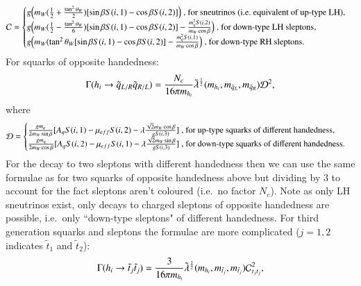 \documentclass[final,3p,times,pdflatex]{elsarticle}
\begin{document}
\begin{equation}
\mathcal{C} = \begin{cases} g\Big(m_{W}(\frac{1}{2}+{\tan^2 \theta_W \over 2})[\sin\beta S(i,1) - \cos\beta S(i,2)]\Big) $ , for sneutrinos (i.e.\ equivalent of up-type LH),$ \\
							g\Big(m_{W}(\frac{1}{2}-{\tan^2 \theta_W \over 6})[\sin\beta S(i,1) - \cos\beta S(i,2)] - {m_{q}^2 S(i,2) \over m_{W} \cos\beta}\Big) $ , for down-type LH sleptons, $ \\
							g\Big(m_{W}(\tan^2 \theta_W[\sin\beta S(i,1) - \cos\beta S(i,2)] - {m_{q}^2 S(i,1) \over m_{W} \cos\beta}\Big) $ , for down-type RH sleptons$. \\
							\end{cases}
\end{equation}
For squarks of opposite handedness:
\begin{equation} \label{hqLRqRLNMSSM}
\Gamma( h_{i} \rightarrow \tilde{q}_{L/R} \tilde{q}_{R/L} ) = {N_{c} \over 16\pi m_{h_i}} \tilde{\lambda}^{1 \over 2}(m_{{h}_i},m_{\tilde{q}_L},m_{\tilde{q}_R})\mathcal{D}^2,
\end{equation}
where
\begin{equation}
\mathcal{D} = \begin{cases} {g m_{q} \over 2 m_{W} \sin\beta} [A_{q} S(i,1) - \mu_{eff}S(i,2) - \lambda {\sqrt{2} m_{W} \cos\beta \over g S(i,3)}]  $ , for up-type squarks of different handedness,$ \\
							{g m_{q} \over 2 m_{W} \cos\beta} [A_{q} S(i,2) - \mu_{eff}S(i,1) - \lambda {\sqrt{2} m_{W} \sin\beta \over g S(i,3)}]  $ , for down-type squarks of different handedness$. \\
							\end{cases}
\end{equation}
For the decay to two sleptons with different handedness then we can use the same formulae as for two squarks of opposite handedness above but dividing by 3 to account for the fact sleptons aren't coloured (i.e.\ no factor $N_{c}$). Note as only LH sneutrinos exist, only decays to charged sleptons of opposite handedness are possible, i.e.\ only ``down-type sleptons" of different handedness.
For third generation squarks and sleptons the formulae are more complicated ($j = 1,2$ indicates $\tilde{t}_1$ and $\tilde{t}_2$):
\begin{equation} \label{hststNMSSM}
\Gamma( h_{i} \rightarrow \tilde{t}_{j} \tilde{t}_{j} ) = {3 \over 16\pi m_{h_i}} \tilde{\lambda}^{1 \over 2}(m_{{h}_i},m_{\tilde{t}_j},m_{\tilde{t}_j})\mathcal{C}_{t_{j}t_{j}}^2,
\end{equation}
\end{document}
